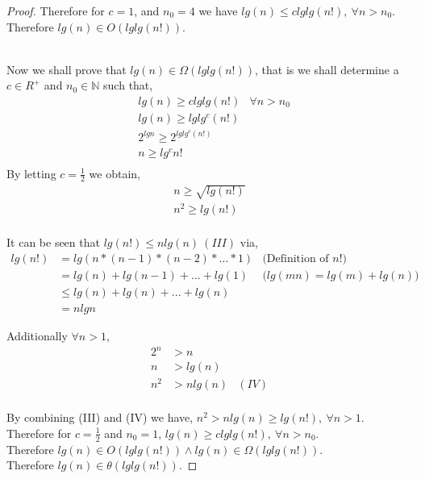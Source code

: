 \documentclass[12pt]{article}
\newcommand{\N}{\mathbb{N}}
\newenvironment{question}[2][Question]{\begin{trivlist}
\item[\hskip \labelsep {\bfseries #1}\hskip \labelsep {\bfseries #2.}]}{\end{trivlist}}
\begin{document}
\begin{question}{2}
\begin{proof}
    Therefore for $c = 1$, and $n_{0} = 4$ we have
    $lg(n) \leq clglg(n!),\ \forall n > n_{0}$.\\
    Therefore $lg(n) \in O(lglg(n!))$.

    \leavevmode \\
    Now we shall prove that $lg(n) \in \Omega(lglg(n!))$, that is we shall
    determine a $c \in R^{+}$ and $n_{0} \in \N$ such that,
    \begin{align*}
      & lg(n) \geq clglg(n!) & \forall n > n_{0}\\
      & lg(n) \geq lglg^{c}(n!)&\\
      & 2^{lgn} \geq 2^{lglg^{c}(n!)} & \\
      & n \geq lg^{c}n! &\\ 
    \end{align*}
    By letting $c = \frac{1}{2}$ we obtain,
    \begin{align*}
      & n \geq \sqrt{lg(n!)} & \\
      & n^{2} \geq lg(n!)    & \\
    \end{align*}
    
    It can be seen that $lg(n!) \leq nlg(n)\ (III)$ via,
    \begin{align*}
      lg(n!) & = lg(n * (n-1) * (n-2) * ... * 1) & \text{(Definition of $n!$)}\\
             & = lg(n) + lg(n - 1) + ... + lg(1) & \text{$(lg(mn) = lg(m) + lg(n)$)}\\
             & \leq lg(n) + lg(n) + ... + lg(n)  &\\
             & = nlgn                            & 
    \end{align*}

    Additionally $\forall n > 1$,
    \begin{align*}
      2^{n} & > n      &\\
          n & > lg(n)  & \\
      n^{2} & > nlg(n) & (IV)\\
    \end{align*}

    By combining (III) and (IV) we have,
    $n^{2} > nlg(n) \geq lg(n!),\ \forall n > 1$.\\
    Therefore for $c = \frac{1}{2}$ and $n_{0} = 1$,
    $lg(n) \geq clglg(n!),\ \forall n > n_{0}$.\\
    Therefore $lg(n) \in O(lglg(n!)) \land lg(n) \in \Omega(lglg(n!))$.\\
    Therefore $lg(n) \in \theta(lglg(n!))$.

  \end{proof}
\end{question}
\end{document}
